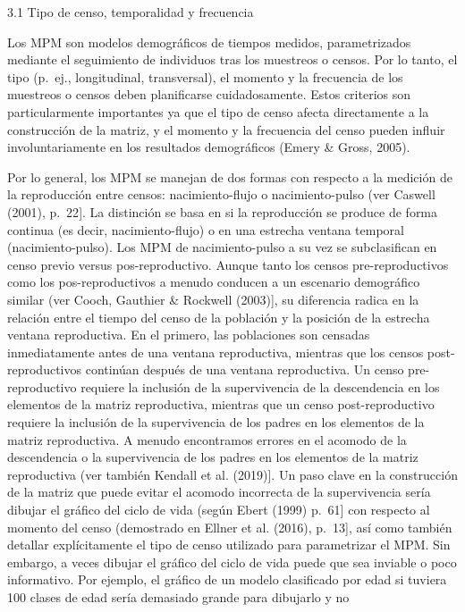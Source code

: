 \documentclass[
  12pt,
  letterpaper,
]{book}
\begin{document}
3.1 \textbar{} Tipo de censo, temporalidad y frecuencia

Los MPM son modelos demográficos de tiempos medidos, parametrizados
mediante el seguimiento de individuos tras los muestreos o censos. Por
lo tanto, el tipo (p.~ej., longitudinal, transversal), el momento y la
frecuencia de los muestreos o censos deben planificarse cuidadosamente.
Estos criterios son particularmente importantes ya que el tipo de censo
afecta directamente a la construcción de la matriz, y el momento y la
frecuencia del censo pueden influir involuntariamente en los resultados
demográficos (Emery \& Gross, 2005).

Por lo general, los MPM se manejan de dos formas con respecto a la
medición de la reproducción entre censos: nacimiento-flujo o
nacimiento-pulso (ver Caswell (2001), p.~22{]}. La distinción se basa en
si la reproducción se produce de forma continua (es decir,
nacimiento-flujo) o en una estrecha ventana temporal (nacimiento-pulso).
Los MPM de nacimiento-pulso a su vez se subclasifican en censo previo
versus pos-reproductivo. Aunque tanto los censos pre-reproductivos como
los pos-reproductivos a menudo conducen a un escenario demográfico
similar (ver Cooch, Gauthier \& Rockwell (2003){]}, su diferencia radica
en la relación entre el tiempo del censo de la población y la posición
de la estrecha ventana reproductiva. En el primero, las poblaciones son
censadas inmediatamente antes de una ventana reproductiva, mientras que
los censos post-reproductivos continúan después de una ventana
reproductiva. Un censo pre-reproductivo requiere la inclusión de la
supervivencia de la descendencia en los elementos de la matriz
reproductiva, mientras que un censo post-reproductivo requiere la
inclusión de la supervivencia de los padres en los elementos de la
matriz reproductiva. A menudo encontramos errores en el acomodo de la
descendencia o la supervivencia de los padres en los elementos de la
matriz reproductiva (ver también Kendall et al. (2019){]}. Un paso clave
en la construcción de la matriz que puede evitar el acomodo incorrecta
de la supervivencia sería dibujar el gráfico del ciclo de vida (según
Ebert (1999) p.~61{]} con respecto al momento del censo (demostrado en
Ellner et al. (2016), p.~13{]}, así como también detallar explícitamente
el tipo de censo utilizado para parametrizar el MPM. Sin embargo, a
veces dibujar el gráfico del ciclo de vida puede que sea inviable o poco
informativo. Por ejemplo, el gráfico de un modelo clasificado por edad
si tuviera 100 clases de edad sería demasiado grande para dibujarlo y no
\end{document}
